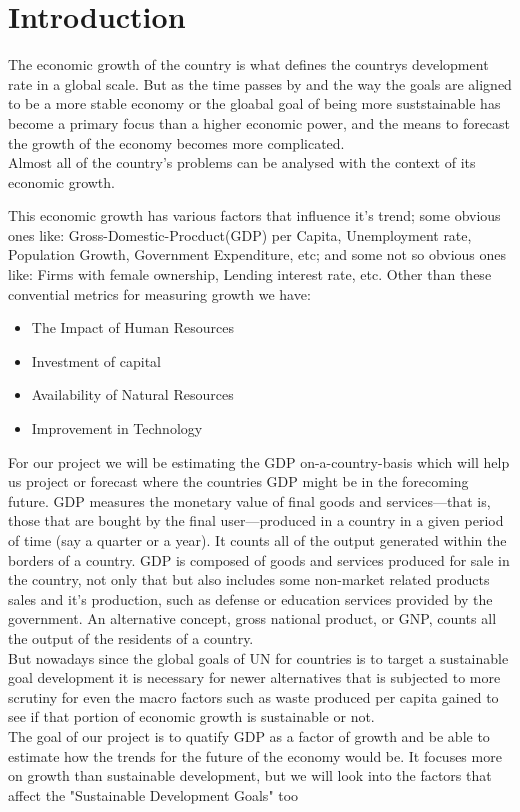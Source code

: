 \documentclass[conference]{IEEEtran}
\begin{document}
\section{Introduction}
The economic growth of the country is what defines the countrys development rate in a global scale.
But as the time passes by and the way the goals are aligned to be a more stable economy or the gloabal goal of
being more suststainable has become a primary focus than a higher economic power,
and the means to forecast the growth of the economy becomes more complicated.\\
Almost all of the country's problems can be analysed with the context of its economic growth.

This economic growth has various factors that influence it's trend; some obvious ones like: Gross-Domestic-Procduct(GDP) per Capita, Unemployment rate, Population Growth, Government Expenditure, etc; and some not so obvious ones like: Firms with female ownership, Lending interest rate, etc.
Other than these convential metrics for measuring growth we have:\\
\begin{itemize}
    \item The Impact of Human Resources
    \item Investment of capital
    \item Availability of Natural Resources
    \item Improvement in Technology
\end{itemize}
\bigskip
For our project we will be estimating the GDP on-a-country-basis which will help us project or forecast where the countries GDP might be in the forecoming future.
GDP measures the monetary value of final goods and services—that is, those that are bought by the final user—produced in a country in a given period of time (say a quarter or a year).
It counts all of the output generated within the borders of a country.
GDP is composed of goods and services produced for sale in the country, not only that but also includes some non-market related products sales and it's production, such as defense or education services provided by the government.
An alternative concept, gross national product, or GNP, counts all the output of the residents of a country.
\\
But nowadays since the global goals of UN for countries is to target a sustainable goal development it is necessary for newer alternatives that is subjected to more scrutiny for even the macro factors such as waste produced per capita gained to see if that portion of economic growth is sustainable or not.
\\The goal of our project is to quatify GDP as a factor of growth and be able to estimate how the trends for the future of the economy would be. It focuses more on growth than sustainable development, but we will look into the factors that affect the "Sustainable Development Goals" too
\bigskip
\end{document}
